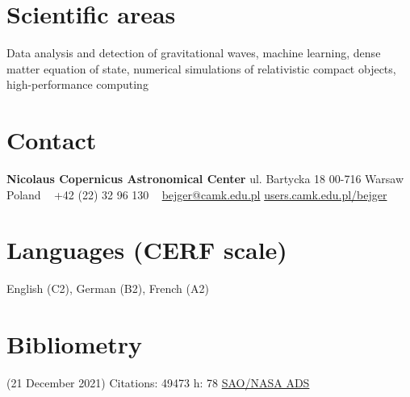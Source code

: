 \documentclass[]{friggeri-cv} %
\begin{document}


\begin{aside} %
\section{Scientific areas} 
Data analysis and detection of gravitational waves, machine learning, dense matter equation of state, numerical simulations of relativistic compact objects, high-performance computing 
~
\section{Contact}
{\bf Nicolaus Copernicus Astronomical Center} 
ul. Bartycka 18
00-716 Warsaw 
Poland
~
+42 (22) 32 96 130
~
\href{mailto:bejger@camk.edu.pl}{bejger@camk.edu.pl}
\href{http://users.camk.edu.pl/bejger}{users.camk.edu.pl/bejger}
~
\section{Languages {\small (CERF scale)}}
English (C2), German (B2), French (A2)
\section{Bibliometry} 
{\small (21 December 2021)}
Citations: 49473
h: 78 
\href{https://ui.adsabs.harvard.edu/search/q=author\%3A\%22Bejger\%2C\%20M.\%22&sort=date\%20desc\%2C\%20bibcode\%20desc&p_=0}{SAO/NASA ADS}
\end{aside}
\end{document}
